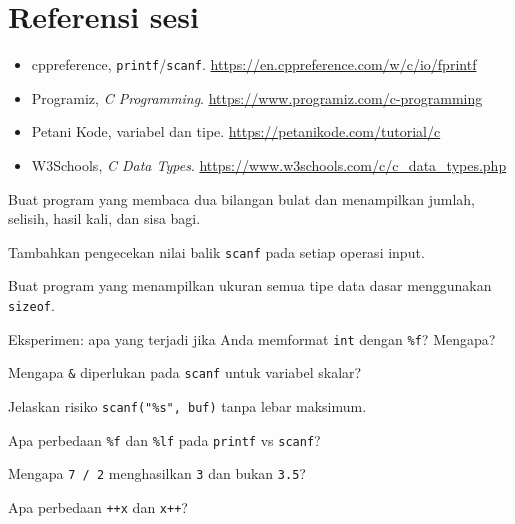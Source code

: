 \documentclass[../main.tex]{subfiles}
\begin{document}


\section{Referensi sesi}

\begin{itemize}[leftmargin=*]
  \item cppreference, \texttt{printf}/\texttt{scanf}. \url{https://en.cppreference.com/w/c/io/fprintf}
  \item Programiz, \textit{C Programming}. \url{https://www.programiz.com/c-programming}
  \item Petani Kode, variabel dan tipe. \url{https://petanikode.com/tutorial/c}
  \item W3Schools, \textit{C Data Types}. \url{https://www.w3schools.com/c/c_data_types.php}
\end{itemize}

\begin{aktivitas}
  \item Buat program yang membaca dua bilangan bulat dan menampilkan jumlah, selisih, hasil kali, dan sisa bagi.
  \item Tambahkan pengecekan nilai balik \texttt{scanf} pada setiap operasi input.
  \item Buat program yang menampilkan ukuran semua tipe data dasar menggunakan \texttt{sizeof}.
  \item Eksperimen: apa yang terjadi jika Anda memformat \texttt{int} dengan \texttt{\%f}? Mengapa?
\end{aktivitas}

\begin{latihan}
  \item Mengapa \texttt{\&} diperlukan pada \texttt{scanf} untuk variabel skalar?
  \item Jelaskan risiko \texttt{scanf("\%s", buf)} tanpa lebar maksimum.
  \item Apa perbedaan \texttt{\%f} dan \texttt{\%lf} pada \texttt{printf} vs \texttt{scanf}?
  \item Mengapa \texttt{7 / 2} menghasilkan \texttt{3} dan bukan \texttt{3.5}?
  \item Apa perbedaan \texttt{++x} dan \texttt{x++}?
\end{latihan}
\end{document}
